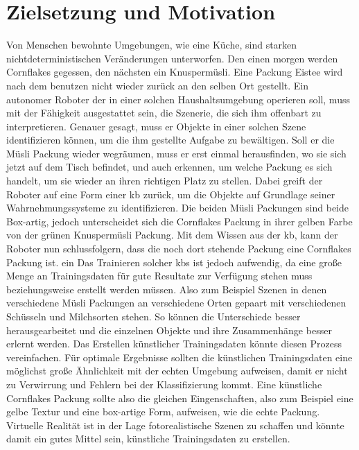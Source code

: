 \graphicspath{{./images/}}      
\def\CHAPTERONE{./chapters/Chapter-1} 

\chapter{Zielsetzung und Motivation}
\label{chap:motivation}
%	


Von Menschen bewohnte Umgebungen, wie eine Küche, sind starken nichtdeterministischen Veränderungen unterworfen. Den einen morgen werden Cornflakes gegessen, den nächsten ein Knuspermüsli. Eine Packung Eistee wird nach dem benutzen nicht wieder zurück an den selben Ort gestellt. Ein autonomer Roboter der in einer solchen Haushaltsumgebung operieren soll, muss mit der Fähigkeit ausgestattet sein, die Szenerie, die sich ihm offenbart zu interpretieren. Genauer gesagt, muss er Objekte in einer solchen Szene identifizieren können, um die ihm gestellte Aufgabe zu bewältigen. Soll er die Müsli Packung wieder wegräumen, muss er erst einmal herausfinden, wo sie sich jetzt auf dem Tisch befindet, und auch erkennen, um welche Packung es sich handelt, um sie wieder an ihren richtigen Platz zu stellen.  Dabei greift der Roboter auf eine Form einer \gls{kb} zurück, um die Objekte auf Grundlage seiner Wahrnehmungssysteme zu identifizieren. Die beiden Müsli Packungen sind beide Box-artig, jedoch unterscheidet sich die Cornflakes Packung in ihrer gelben Farbe von der grünen Knuspermüsli Packung. Mit dem Wissen aus der \gls{kb}, kann der Roboter nun schlussfolgern, dass die noch dort stehende Packung eine Cornflakes Packung ist. ein Das Trainieren solcher \glspl{kb} ist jedoch aufwendig, da eine große Menge an Trainingsdaten für gute Resultate zur Verfügung stehen muss beziehungsweise erstellt werden müssen. Also zum Beispiel Szenen in denen verschiedene Müsli Packungen an verschiedene Orten gepaart mit verschiedenen Schüsseln und Milchsorten stehen. So können die Unterschiede besser herausgearbeitet und die einzelnen Objekte und ihre Zusammenhänge besser erlernt werden. Das Erstellen künstlicher Trainingsdaten könnte diesen Prozess vereinfachen. Für optimale Ergebnisse sollten die künstlichen Trainingsdaten eine möglichst große Ähnlichkeit mit der echten Umgebung aufweisen, damit er nicht zu Verwirrung und Fehlern bei der Klassifizierung kommt. Eine künstliche Cornflakes Packung sollte also die gleichen Eingenschaften, also zum Beispiel eine gelbe Textur und eine box-artige Form, aufweisen, wie die echte Packung. Virtuelle Realität ist in der Lage fotorealistische Szenen zu schaffen und könnte damit ein gutes Mittel sein, künstliche Trainingsdaten zu erstellen.  

